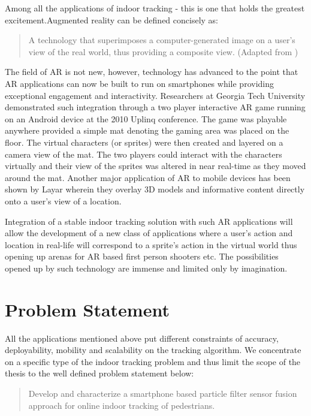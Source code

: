 Among all the applications of indoor tracking - this is one that holds the 
greatest excitement.Augmented reality can be defined concisely as:
\begin{quote}
A technology that superimposes a computer-generated image on a user's view of
the real world, thus providing a composite view. (Adapted from \cite{SciDict})
\end{quote}

The field of AR is not new, however, technology has advanced to the point that
AR applications can now be built to run on smartphones while providing
exceptional engagement and interactivity. Researchers at Georgia Tech University
demonstrated such integration through a two player interactive AR game running
on an Android device at the 2010 Uplinq conference. The game was playable
anywhere provided a simple mat denoting the gaming area was placed on the floor.
The virtual characters (or sprites) were then created and layered on a camera
view of the mat. The two players could interact with the characters virtually
and their view of the sprites was altered in near real-time as they moved around
the mat. Another major application of AR to mobile devices has been shown by 
Layar wherein they overlay 3D models and informative content directly onto 
a user's view of a location. 

Integration of a stable indoor tracking solution with such AR applications will
allow the development of a new class of applications where a user's action and
location in real-life will correspond to a sprite's action in the virtual world
thus opening up arenas for AR based first person shooters etc. The possibilities
opened up by such technology are immense and limited only by imagination.


\section{Problem Statement\label{sec:problem_description}}
All the applications mentioned above put different constraints of accuracy,
deployability, mobility and scalability on the tracking algorithm. We
concentrate on a specific type of the indoor tracking problem and thus limit
the scope of the thesis to the well defined problem statement below:

\begin{quote}
Develop and characterize a smartphone based particle filter sensor fusion
approach for online indoor tracking of pedestrians. 
\end{quote}


